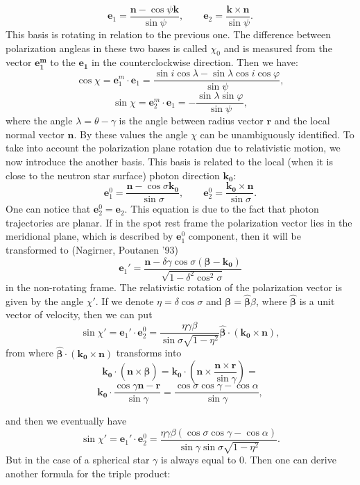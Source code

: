 \documentclass[iop, usenatbib]{emulateapj}
\newcommand{\be}{\begin{equation}}
\newcommand{\ee}{\end{equation}}
\begin{document}
\be
\bm{e}_1 = \frac{\bm{n}-\cos{\psi} \bm{k}}{\sin{\psi}},\qquad 
\bm{e}_2 = \frac{\bm{k} \times \bm{n}}{\sin{\psi}} .
\ee
This basis is rotating in relation to the previous one. The difference between polarization angleas in these two bases is called $ \chi _0 $ and is measured from the vector $\bm{e_1^m}$ to the $\bm{e_1}$  in the counterclockwise direction. Then we have:
$$
\cos{\chi}=\bm{e}_1^m \cdot \bm{e}_1 = \frac{\sin{i}\cos{\lambda}-\sin{\lambda}\cos{i}\cos{\varphi}}{\sin{\psi}} , 
$$\be
\sin{\chi}=\bm{e}_2^m \cdot \bm{e}_1 = - \frac{\sin{\lambda}\sin{\varphi}}{\sin{\psi}} ,
\ee
where the angle $\lambda=\theta-\gamma$ is the angle between radius vector $\bm{r}$ and the local normal vector $\bm{n}$. By these values the angle $\chi$ can be unambiguously identified. To take into account the polarization plane rotation due to relativistic  motion, we now introduce the another basis. This basis is related to the local (when it is close to the neutron star surface) photon direction  $\bm{k_0}$:
\be
\bm{e}_1^0 = \frac{\bm{n}-\cos{\sigma} \bm{k_0}}{\sin{\sigma}},\qquad 
\bm{e}_2^0 = \frac{\bm{k_0} \times \bm{n}}{\sin{\sigma}} .
\ee
One can notice that $\bm{e}_2^0 =\bm{e}_2$. This equation is due to the fact that photon trajectories are planar. 
If in the spot rest frame the polarization vector lies in the meridional plane, which is described by $\bm{e}_1^0$ component, then it will be transformed to (Nagirner, Poutanen '93)
\be
\bm{e}_1' = \frac{\bm{n}-\delta\gamma\cos{\sigma} (\bm{\beta-k_0})}{\sqrt{1-\delta^2 \cos^2{\sigma} } }
\ee
in the non-rotating frame. The relativistic rotation of the polarization vector is given by the angle $\chi'$. If we denote $\eta=\delta\cos{\sigma}$ and $\bm{\beta}=\bm{\hat\beta} \beta$, where $\bm{\hat\beta}$ is a unit vector of velocity, then we can put
\be
\sin{\chi'}=\bm{e}_1'\cdot \bm{e}_2^0 =
 \frac{\eta\gamma\beta }{\sin{\sigma}\sqrt{1-\eta^2} } \bm{\hat\beta} \cdot(\bm{k_0} \times \bm{n}),
\ee
from where $\bm{\hat\beta} \cdot(\bm{k_0} \times \bm{n}) $ transforms into 
\be
 \bm{k_0} \cdot (\bm{n}\times\bm{\hat\beta} )=
 \bm{k_0} \cdot \left(\bm{n} \times \frac{\bm{n} \times \bm{r}}{\sin{\gamma}}\right)=\ee$$
 \bm{k_0} \cdot \frac{\cos{\gamma}\bm{n} - \bm{r}}{\sin{\gamma}} =
 \frac{\cos{\sigma}\cos{\gamma}-\cos{\alpha}}{\sin{\gamma}},
$$

and then we eventually have \be
\sin{\chi'}=\bm{e}_1'\cdot \bm{e}_2^0 =
 \frac{\eta\gamma\beta (\cos{\sigma}\cos{\gamma}-\cos{\alpha})}{\sin{\gamma}\sin{\sigma}\sqrt{1-\eta^2} }.
\ee
But in the case of a spherical star $\gamma$ is always equal to $0$. 
Then one can derive another formula for the triple product:
\end{document}
